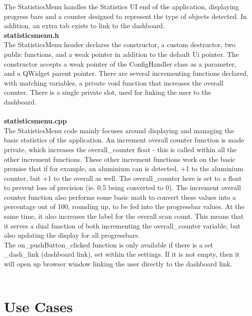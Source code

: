 \documentclass[conference]{IEEEtran}
\begin{document}
The StatisticsMenu handles the Statistics UI end of the application, displaying progress bars and a counter designed to represent the type of objects detected. In addition, an extra tab exists to link to the dashboard.\\


\textbf{statisticsmenu.h}~\\

The StatisticsMenu header declares the constructor, a custom destructor, two public functions, and a weak pointer in addition to the default Ui pointer. The constructor accepts a weak pointer of the ConfigHandler class as a parameter, and a QWidget parent pointer. There are several incrementing functions declared, with matching variables, a private void function that increases the overall counter. There is a single private slot, used for linking the user to the dashboard.~\\~\\


\textbf{statisticsmenu.cpp}~\\

The StatisticsMenu code mainly focuses around displaying and managing the basic statistics of the application. An increment overall counter function is made private, which increases the overall\_counter float - this is called within all the other increment functions. These other increment functions work on the basic premise that if for example, an aluminium can is detected, +1 to the aluminium counter, but +1 to the overall as well. The overall\_counter here is set to a float to prevent loss of precision (ie. 0.5 being converted to 0). The increment overall counter function also performs some basic math to convert these values into a percentage out of 100, rounding up, to be fed into the progressbar values. At the same time, it also increases the label for the overall scan count. This means that it serves a dual function of both incrementing the overall\_counter variable, but also updating the display for all progressbars.\\

The on\_pushButton\_clicked function is only available if there is a set \_dash\_link (dashboard link), set within the settings. If it is not empty, then it will open up browser window linking the user directly to the dashboard link.~\\~\\


\section{Use Cases}
\end{document}
